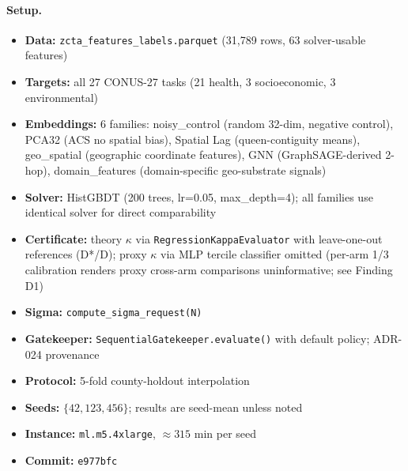 \documentclass{article}
\begin{document}
\paragraph{Setup.}
\begin{itemize}
\item \textbf{Data:} \texttt{zcta\_features\_labels.parquet} (31{,}789 rows, 63 solver-usable features)
\item \textbf{Targets:} all 27 CONUS-27 tasks (21 health, 3 socioeconomic, 3 environmental)
\item \textbf{Embeddings:} 6 families: noisy\_control (random 32-dim, negative control), PCA32 (ACS no spatial bias), Spatial Lag (queen-contiguity means), geo\_spatial (geographic coordinate features), GNN (GraphSAGE-derived 2-hop), domain\_features (domain-specific geo-substrate signals)
\item \textbf{Solver:} HistGBDT (200 trees, lr=0.05, max\_depth=4); all families use identical solver for direct comparability
\item \textbf{Certificate:} theory $\kappa$ via \texttt{RegressionKappaEvaluator} with leave-one-out references (D*/D); proxy $\kappa$ via MLP tercile classifier omitted (per-arm 1/3 calibration renders proxy cross-arm comparisons uninformative; see Finding D1)
\item \textbf{Sigma:} \texttt{compute\_sigma\_request(N)}
\item \textbf{Gatekeeper:} \texttt{SequentialGatekeeper.evaluate()} with default policy; ADR-024 provenance
\item \textbf{Protocol:} 5-fold county-holdout interpolation
\item \textbf{Seeds:} $\{42, 123, 456\}$; results are seed-mean unless noted
\item \textbf{Instance:} \texttt{ml.m5.4xlarge}, ${\approx}315$ min per seed
\item \textbf{Commit:} \texttt{e977bfc}
\end{itemize}
\end{document}
